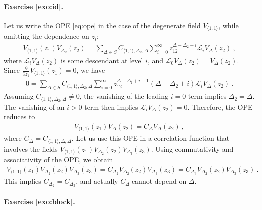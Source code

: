 \documentclass[12pt, a4paper]{article}
\theoremstyle{break}
\begin{document}
\paragraph{Exercise \ref{exo:id}.} 

Let us write the OPE \eqref{eq:ope} in the case of the degenerate field $V_{\langle 1,1\rangle}$, while omitting the dependence on $\bar z_i$:
\begin{align}
 V_{\langle 1,1\rangle}(z_1) V_{\Delta_2}(z_2) = \sum_{\Delta\in S} C_{\langle 1,1\rangle,\Delta_2,\Delta}  \sum_{i=0}^\infty z_{12}^{\Delta-\Delta_2+i} \mathcal{L}_i V_\Delta(z_2) \ ,
\end{align}
where $\mathcal{L}_i V_\Delta(z_2)$ is some descendant at level $i$, and $\mathcal{L}_0 V_\Delta(z_2) = V_\Delta(z_2)$. Since $\frac{\partial}{\partial z_1} V_{\langle 1,1\rangle}(z_1) =0 $, we have 
\begin{align}
 0 = \sum_{\Delta\in S} C_{\langle 1,1\rangle,\Delta_2,\Delta}  \sum_{i=0}^\infty z_{12}^{\Delta-\Delta_2+i-1}(\Delta-\Delta_2+i) \mathcal{L}_i V_\Delta(z_2) \ .
\end{align}
Assuming $C_{\langle 1,1\rangle,\Delta_2,\Delta}\neq 0$, the vanishing of the leading $i=0$ term implies $\Delta_2=\Delta$. The vanishing of an $i>0$ term then implies $\mathcal{L}_i V_\Delta(z_2) =0$. Therefore, the OPE reduces to 
\begin{align}
 V_{\langle 1,1\rangle}(z_1) V_{\Delta}(z_2) = C_\Delta V_\Delta(z_2)\ ,
\end{align}
where $C_\Delta = C_{\langle 1,1\rangle,\Delta,\Delta} $. Let us use this OPE in a correlation function that involves the fields $V_{\langle 1,1\rangle}(z_1)V_{\Delta_2}(z_2) V_{\Delta_3}(z_3)$. Using commutativity and associativity of the OPE, we obtain
\begin{align}
 V_{\langle 1,1\rangle}(z_1)V_{\Delta_2}(z_2) V_{\Delta_3}(z_3) = C_{\Delta_2} V_{\Delta_2}(z_2) V_{\Delta_3}(z_3) = C_{\Delta_3} V_{\Delta_2}(z_2) V_{\Delta_3}(z_3)\ .
\end{align}
This implies $C_{\Delta_2}=C_{\Delta_3}$, and actually $C_\Delta$ cannot depend on $\Delta$.

\paragraph{Exercise \ref{exo:block}.}
\end{document}
